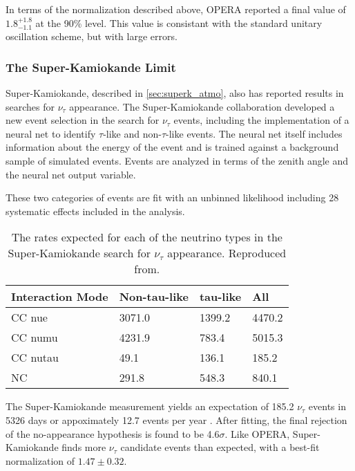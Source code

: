 In terms of the normalization described above, OPERA reported a final value of $1.8^{+1.8}_{-1.1}$ at the 90\% level. 
This value is consistant with the standard unitary oscillation scheme, but with large errors.

\label{subsubsec:superk_limit}
\subsubsection{The Super-Kamiokande Limit}
Super-Kamiokande, described in \ref{sec:superk_atmo}, also has reported results in searches for $\nu_\tau$ appearance.
The Super-Kamiokande collaboration developed a new event selection in the search for $\nu_\tau$ events, including the implementation of a neural net  to identify $\tau$-like and non-$\tau$-like events.
The neural net itself includes information about the energy of the event and is trained against a background sample of simulated events.
Events are analyzed in terms of the zenith angle and the neural net output variable.

These two categories of events are fit with an unbinned likelihood including 28 systematic effects included in the analysis.

\begin{table}[]
\centering
\begin{tabular}{@{}llll@{}}
\toprule
Interaction Mode & Non-tau-like & tau-like & All    \\ \midrule
CC nue       & 3071.0          & 1399.2      & 4470.2 \\
CC numu     & 4231.9          & 783.4       & 5015.3 \\
CC nutau    & 49.1            & 136.1       & 185.2  \\
NC               & 291.8           & 548.3       & 840.1  \\ \bottomrule
\end{tabular}
\caption{The rates expected for each of the neutrino types in the Super-Kamiokande search for $\nu_\tau$ appearance. Reproduced from.}
\label{tab:superk_appearance_rates}
\end{table}

The Super-Kamiokande measurement yields an expectation of 185.2 $\nu_\tau$ events in 5326 days or appoximately 12.7 events per year . 
After fitting, the final rejection of the no-appearance hypothesis is found to be 4.6$\sigma$.
Like OPERA, Super-Kamiokande finds more $\nu_\tau$ candidate events than expected, with a best-fit normalization of $1.47 \pm 0.32$.

